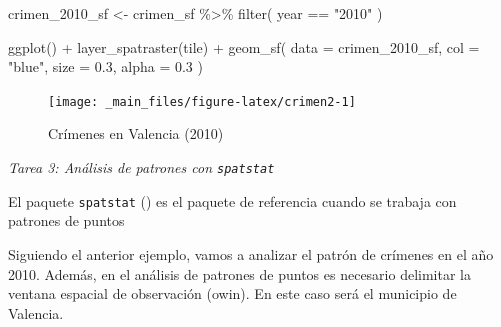 \documentclass[
]{book}
\newenvironment{Shaded}{\begin{snugshade}}{\end{snugshade}}
\newcommand{\AttributeTok}[1]{\textcolor[rgb]{0.77,0.63,0.00}{#1}}
\newcommand{\FloatTok}[1]{\textcolor[rgb]{0.00,0.00,0.81}{#1}}
\newcommand{\FunctionTok}[1]{\textcolor[rgb]{0.00,0.00,0.00}{#1}}
\newcommand{\NormalTok}[1]{#1}
\newcommand{\OtherTok}[1]{\textcolor[rgb]{0.56,0.35,0.01}{#1}}
\newcommand{\SpecialCharTok}[1]{\textcolor[rgb]{0.00,0.00,0.00}{#1}}
\newcommand{\StringTok}[1]{\textcolor[rgb]{0.31,0.60,0.02}{#1}}
\begin{document}
\begin{Shaded}
\begin{Highlighting}[]
\NormalTok{crimen\_2010\_sf }\OtherTok{\textless{}{-}}\NormalTok{ crimen\_sf }\SpecialCharTok{\%\textgreater{}\%}
  \FunctionTok{filter}\NormalTok{(}
\NormalTok{    year }\SpecialCharTok{==} \StringTok{"2010"}
\NormalTok{  )}

\FunctionTok{ggplot}\NormalTok{() }\SpecialCharTok{+}
  \FunctionTok{layer\_spatraster}\NormalTok{(tile) }\SpecialCharTok{+}
  \FunctionTok{geom\_sf}\NormalTok{(}
    \AttributeTok{data =}\NormalTok{ crimen\_2010\_sf,}
    \AttributeTok{col =} \StringTok{"blue"}\NormalTok{,}
    \AttributeTok{size =} \FloatTok{0.3}\NormalTok{,}
    \AttributeTok{alpha =} \FloatTok{0.3}
\NormalTok{  )}
\end{Highlighting}
\end{Shaded}

\begin{figure}

{\centering \texttt{[image: \_main\_files/figure-latex/crimen2-1]} 

}

\caption{Crímenes en Valencia (2010)}\label{fig:crimen2}
\end{figure}

\emph{Tarea 3: Análisis de patrones con \texttt{spatstat}}

El paquete \texttt{spatstat} (\citet{spatstat_2005}) es el paquete de referencia cuando se
trabaja con patrones de puntos

Siguiendo el anterior ejemplo, vamos a analizar el patrón de crímenes en el año
2010. Además, en el análisis de patrones de puntos es necesario delimitar la
ventana espacial de observación (owin). En este caso será el municipio de
Valencia.
\end{document}
